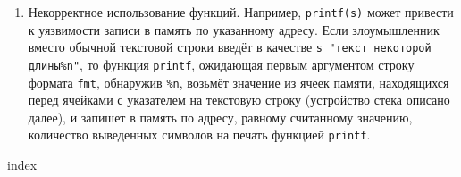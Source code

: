 \begin{enumerate}
\begin{enumerate}
        \end{enumerate}
    \item Некорректное использование функций. Например, \texttt{printf(s)} может привести к уязвимости записи в память по указанному адресу. Если злоумышленник вместо обычной текстовой строки введёт в качестве \texttt{s "текст некоторой длины\%n"}, то функция \texttt{printf}, ожидающая первым аргументом строку формата \texttt{fmt}, обнаружив \texttt{\%n}, возьмёт значение из ячеек памяти, находящихся перед ячейками с указателем на текстовую строку (устройство стека описано далее), и запишет в память по адресу, равному считанному значению, количество выведенных символов на печать функцией \texttt{printf}.
\end{enumerate}









{index}

\printindex

\printbibliography[heading=bibintoc,title={Литература}]


